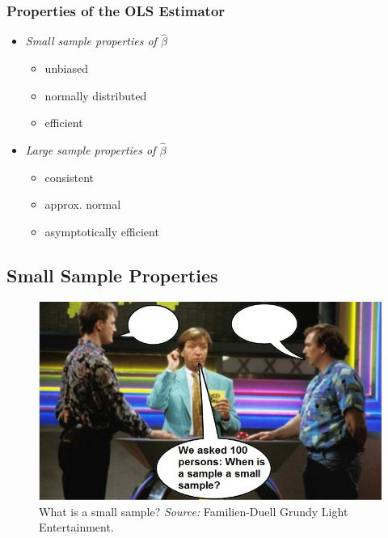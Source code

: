 \documentclass[a4paper,12pt]{article}
\def\emph{\textit}
\begin{document}
\subsubsection*{Properties of the OLS Estimator}



\begin{itemize}
	\item \emph{Small sample properties of $\hat{\beta}$}
\begin{itemize}
	\item unbiased
	\item normally distributed
	\item efficient\\[4ex]
\end{itemize}
	\item \emph{Large sample properties of $\hat{\beta}$}
\begin{itemize}
	\item consistent
	\item approx. normal
	\item asymptotically efficient
\end{itemize}
\end{itemize}



\clearpage


\subsection*{Small Sample Properties}
\begin{figure}[H]
	\centering
		\includegraphics[width=.9\textwidth]{figures/SmallSample_empty}
	\caption{What is a small sample?\hspace{\textwidth} \emph{Source:} Familien-Duell \hspace{\textwidth}Grundy Light Entertainment. \label{fig:SS}}
\end{figure}
\end{document}
